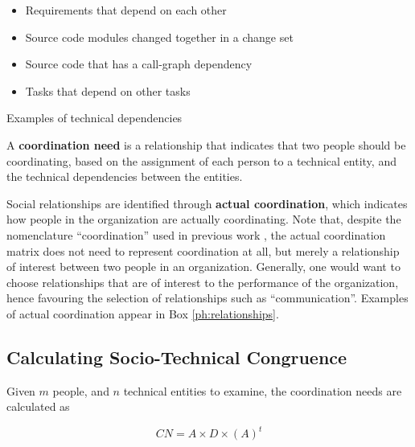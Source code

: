 \begin{placeholder}[t]
\begin{itemize}
\item Requirements that depend on each other~\cite{marczak:re:2008,marczak2009:crossfunctional}
\item Source code modules changed together in a change set~\cite{cataldo:cscw:2006,cataldo:esem:2008}
\item Source code that has a call-graph dependency~\cite{deSouza2004:thwarts_collaboration}
\item Tasks that depend on other tasks \cite{wolf:ieee:2009}
\end{itemize}

\caption{Examples of technical dependencies}
\label{ph:technicalunits}
\end{placeholder}



A \textbf{coordination need} is a relationship that indicates that two people should be coordinating, based on the assignment of each person to a technical entity, and the technical dependencies between the entities.

Social relationships are identified through \textbf{actual coordination}, which indicates how people in the organization are actually coordinating. Note that, despite the nomenclature ``coordination'' used in previous work \cite{cataldo:cscw:2006}, the actual coordination matrix does not need to represent coordination at all, but merely a relationship of interest between two people in an organization. Generally, one would want to choose relationships that are of interest to the performance of the organization, hence favouring the selection of relationships such as ``communication''. Examples of actual coordination appear in Box \ref{ph:relationships}.




\subsection{Calculating Socio-Technical Congruence}
\label{sec:stc}

Given $m$ people, and $n$ technical entities to examine, the coordination needs are calculated as 

\[ CN = A \times D \times (A)^t \]

